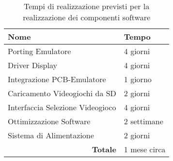 \documentclass[12pt]{article}
\begin{document}
\begin{center}
\begin{table}[h]
    \centering
    \begin{tabular}{|l|l|}
        \hline
        \textbf{Nome}                         & \textbf{Tempo}  \\ \hline
        Porting Emulatore                     & 4 giorni        \\ \hline
        Driver Display                        & 4 giorni        \\ \hline
        Integrazione PCB-Emulatore            & 1 giorno        \\ \hline
        Caricamento Videogiochi da SD         & 2 giorni        \\ \hline
        Interfaccia Selezione Videogioco      & 4 giorni        \\ \hline
        Ottimizzazione Software               & 2 settimane     \\ \hline
        Sistema di Alimentazione              & 2 giorni        \\ \hline
        \multicolumn{1}{|r|}{\textbf{Totale}} & 1 mese circa    \\ \hline
    \end{tabular}
    \caption{
        Tempi di realizzazione previsti per la realizzazione dei componenti software
    }
\end{table}

\end{center}
\end{document}

